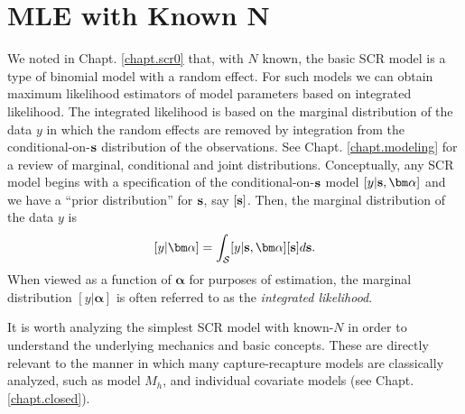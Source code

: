 \section{MLE with Known N}

We noted in Chapt. \ref{chapt.scr0} that, with $N$ known, the basic
SCR model is a type of binomial model with a random effect. For such
models we can obtain maximum likelihood estimators of model parameters
based on integrated likelihood. The integrated likelihood is based on
the marginal distribution of the data $y$ in which the random effects
are removed by integration from the conditional-on-${\bf s}$
distribution of the observations. See Chapt. \ref{chapt.modeling} for
a review of marginal, conditional and joint distributions.
Conceptually, any SCR model begins with a specification of the
conditional-on-${\bf s}$ model $[y|{\bf s},{\bm \alpha}]$ and we have
a ``prior distribution'' for ${\bf s}$, say $[{\bf s}]$. Then, the
marginal distribution of the data $y$ is
\[
[y|{\bm \alpha}] =  \int_{\cal S} [y|{\bf s},{\bm \alpha}][{\bf s}] d{\bf s}.
\]
When viewed as a function of ${\bm \alpha}$ for purposes of
estimation, the marginal distribution $[y|{\bm \alpha}]$ is often
referred to as the {\it integrated likelihood}.

It is worth analyzing the simplest SCR model with known-$N$ in order
to understand the underlying mechanics and basic concepts. These are
directly relevant to the manner in which many capture-recapture models
are classically analyzed, such as model $M_h$, and individual
covariate models (see Chapt. \ref{chapt.closed}).

